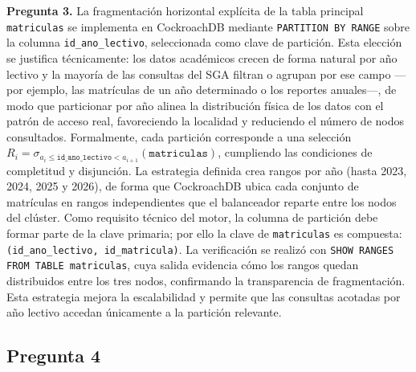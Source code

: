 \documentclass[10pt,a4paper]{article}
\begin{document}
\textbf{Pregunta 3.} La fragmentación horizontal explícita de la tabla principal
\texttt{matriculas} se implementa en CockroachDB mediante \texttt{PARTITION BY RANGE}
sobre la columna \texttt{id\_ano\_lectivo}, seleccionada como clave de partición. Esta
elección se justifica técnicamente: los datos académicos crecen de forma natural por
año lectivo y la mayoría de las consultas del SGA filtran o agrupan por ese campo ---por
ejemplo, las matrículas de un año determinado o los reportes anuales---, de modo que
particionar por año alinea la distribución física de los datos con el patrón de acceso
real, favoreciendo la localidad y reduciendo el número de nodos consultados. Formalmente,
cada partición corresponde a una selección
$R_i = \sigma_{a_i \le \texttt{id\_ano\_lectivo} < a_{i+1}}(\texttt{matriculas})$,
cumpliendo las condiciones de completitud y disjunción. La estrategia definida crea
rangos por año (hasta 2023, 2024, 2025 y 2026), de forma que CockroachDB ubica cada
conjunto de matrículas en rangos independientes que el balanceador reparte entre los
nodos del clúster. Como requisito técnico del motor, la columna de partición debe formar
parte de la clave primaria; por ello la clave de \texttt{matriculas} es compuesta:
\texttt{(id\_ano\_lectivo, id\_matricula)}. La verificación se realizó con
\texttt{SHOW RANGES FROM TABLE matriculas}, cuya salida evidencia cómo los rangos quedan
distribuidos entre los tres nodos, confirmando la transparencia de fragmentación. Esta
estrategia mejora la escalabilidad y permite que las consultas acotadas por año lectivo
accedan únicamente a la partición relevante.

\subsection*{Pregunta 4}
\end{document}
